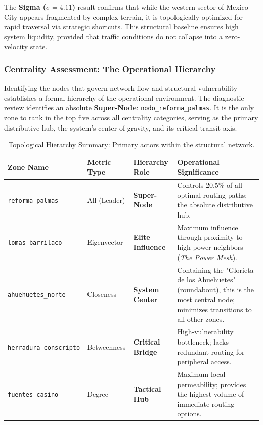 The \textbf{Sigma ($\sigma = 4.11$)} result confirms that while the western sector of Mexico City appears fragmented by complex terrain, it is topologically optimized for rapid traversal via strategic shortcuts. This structural baseline ensures high system liquidity, provided that traffic conditions do not collapse into a zero-velocity state.


\subsubsection{Centrality Assessment: The Operational Hierarchy}
Identifying the nodes that govern network flow and structural vulnerability establishes a formal hierarchy of the operational environment. The diagnostic review identifies an absolute \textbf{Super-Node}: \texttt{nodo\_reforma\_palmas}. It is the only zone to rank in the top five across all centrality categories, serving as the primary distributive hub, the system's center of gravity, and its critical transit axis.

\begin{table}[H]
    \centering
    \small
    \begin{tabularx}{\textwidth}{l l l X}
        \toprule
        \textbf{Zone Name} & \textbf{Metric Type} & \textbf{Hierarchy Role} & \textbf{Operational Significance} \\
        \midrule
        \texttt{reforma\_palmas} & All (Leader) & \textbf{Super-Node} & Controls 20.5\% of all optimal routing paths; the absolute distributive hub. \\
        \addlinespace
        \texttt{lomas\_barrilaco} & Eigenvector & \textbf{Elite Influence} & Maximum influence through proximity to high-power neighbors (\textit{The Power Mesh}). \\
        \addlinespace
        \texttt{ahuehuetes\_norte} & Closeness & \textbf{System Center} & Containing the "Glorieta de los Ahuehuetes" (roundabout), this  is the most central node; minimizes transitions to all other zones. \\
        \addlinespace
        \texttt{herradura\_conscripto} & Betweenness & \textbf{Critical Bridge} & High-vulnerability bottleneck; lacks redundant routing for peripheral access. \\
        \addlinespace
        \texttt{fuentes\_casino} & Degree & \textbf{Tactical Hub} & Maximum local permeability; provides the highest volume of immediate routing options. \\
        \bottomrule
    \end{tabularx}
    \caption{Topological Hierarchy Summary: Primary actors within the structural network.}
    \label{tab:centrality_summary}
\end{table}

